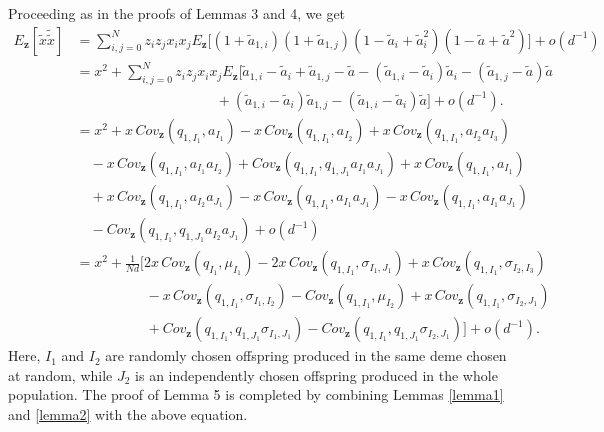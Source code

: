 \documentclass[11pt]{article}
\begin{document}
Proceeding as in the proofs of Lemmas 3 and 4, we get
\begin{align}\label{sec2-eq26}
E_{\mathbf{z}}\left[\tilde{x}\tilde{\tilde{x}}\right]&=\sum_{i,j=0}^{N}z_iz_jx_ix_jE_{\mathbf{z}}\Big[\left(1+\tilde{a}_{1,i}\right)\left(1+\tilde{a}_{1,j}\right)\left(1-\tilde{a}_{i}+\tilde{a}_{i}^2\right)\left(1-\tilde{a}+\tilde{a}^2\right)\Big]+o(d^{-1})\nonumber\\
&=x^2+\sum_{i,j=0}^{N}z_iz_jx_ix_j
E_{\mathbf{z}}\Big[\tilde{a}_{1,i}-\tilde{a}_{i}+\tilde{a}_{1,j}-\tilde{a}-\left(\tilde{a}_{1,i}-\tilde{a}_{i}\right)\tilde{a}_{i}-\left(\tilde{a}_{1,j}-\tilde{a}\right)\tilde{a}\nonumber\\
&\quad\quad\quad\quad\quad\quad\quad\quad\quad\quad+\left(\tilde{a}_{1,i}-\tilde{a}_{i}\right)\tilde{a}_{1,j}-\left(\tilde{a}_{1,i}-\tilde{a}_{i}\right)\tilde{a}\Big]
+o(d^{-1}).\nonumber\\
&=x^2+
x\,Cov_{\mathbf{z}}(q_{1,I_1},a_{I_1})-x\,Cov_{\mathbf{z}}(q_{1,I_1},a_{I_2})
+x\,Cov_{\mathbf{z}}(q_{1,I_1},a_{I_2}a_{I_3})\nonumber\\
&\quad-x\,Cov_{\mathbf{z}}(q_{1,I_1},a_{I_1}a_{I_2})
+Cov_{\mathbf{z}}(q_{1,I_1},q_{1,J_1}a_{I_1}a_{J_1})
+x\,Cov_{\mathbf{z}}(q_{1,I_1},a_{I_1})\nonumber\\
&
\quad+x\,Cov_{\mathbf{z}}(q_{1,I_1},a_{I_2}a_{J_1})
-x\,Cov_{\mathbf{z}}(q_{1,I_1},a_{I_1}a_{J_1})
-x\,Cov_{\mathbf{z}}(q_{1,I_1},a_{I_1}a_{J_1})\nonumber\\
&\quad-Cov_{\mathbf{z}}(q_{1,I_1},q_{1,J_1}a_{I_2}a_{J_1})
+o(d^{-1})\nonumber\\
&=x^2+\frac{1}{Nd}\Big[
2x\,Cov_{\mathbf{z}}(q_{I_1},\mu_{I_1})
-2x\,Cov_{\mathbf{z}}(q_{1,I_1},\sigma_{I_1,J_1})
+x\,Cov_{\mathbf{z}}(q_{1,I_1},\sigma_{I_2,I_3})\nonumber\\
&\quad\quad\quad\quad\quad-x\,Cov_{\mathbf{z}}(q_{1,I_1},\sigma_{I_1,I_2})
-Cov_{\mathbf{z}}(q_{1,I_1},\mu_{I_2})
+x\,Cov_{\mathbf{z}}(q_{1,I_1},\sigma_{I_2,J_1})\nonumber\\
&\quad\quad\quad\quad\quad+Cov_{\mathbf{z}}(q_{1,I_1},q_{1,J_1}\sigma_{I_1,J_1})
-Cov_{\mathbf{z}}(q_{1,I_1},q_{1,J_1}\sigma_{I_2,J_1})
\Big]+o(d^{-1}).
\end{align}
Here, $I_1$ and $I_2$ are randomly chosen offspring produced in the same deme chosen at random, while $J_2$ is an independently chosen offspring produced in the whole population. 
The proof of Lemma 5 is completed by combining Lemmas \ref{lemma1} and \ref{lemma2} with the above equation.
\end{document}
